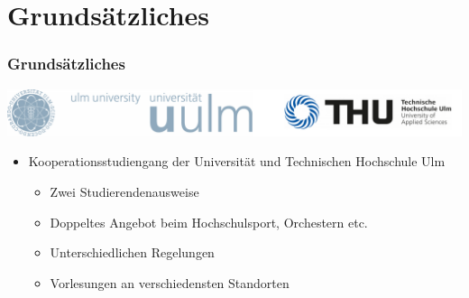 \documentclass[10pt,a4paper]{beamer}
\begin{document}
\section{Grundsätzliches}
\begin{frame}
\frametitle{Grundsätzliches}
\begin{center}
\includegraphics[width=0.8\paperwidth]{logos.png}
\end{center}
\vspace{0.3cm}
	\begin{itemize}
		\item Kooperationsstudiengang der Universität und Technischen Hochschule Ulm
		\begin{itemize}
			\setlength{\itemsep}{10pt} %
			\item Zwei Studierendenausweise
			\item Doppeltes Angebot beim Hochschulsport, Orchestern etc.
			\item Unterschiedlichen Regelungen
			\item Vorlesungen an verschiedensten Standorten
		\end{itemize}
	\end{itemize}
\end{frame}

\begin{frame}
\begin{center}
    \end{center}
\end{frame}
\end{document}
